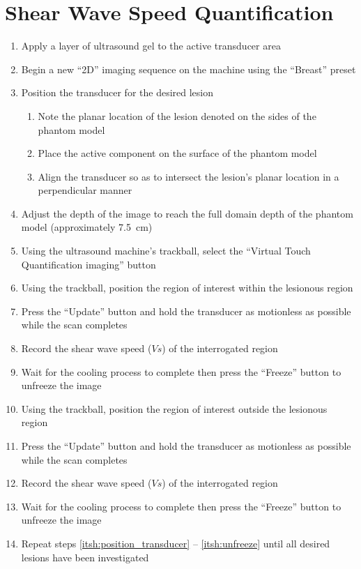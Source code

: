 	\section{Shear Wave Speed Quantification}
		\label{appsec:experimental_shear}
		\begin{enumerate}
			\item Apply a layer of ultrasound gel to the active transducer area
			\item Begin a new ``2D'' imaging sequence on the machine using the ``Breast'' preset
			\item \label{itsh:position_transducer} Position the transducer for the desired lesion
			\begin{enumerate}
				\item Note the planar location of the lesion denoted on the sides of the phantom model
				\item Place the active component on the surface of the phantom model
				\item Align the transducer so as to intersect the lesion's planar location in a perpendicular manner
			\end{enumerate}
			\item Adjust the depth of the image to reach the full domain depth of the phantom model (approximately \SI{7.5}{\cm})
			\item Using the ultrasound machine's trackball, select the ``Virtual Touch Quantification imaging'' button
			\item Using the trackball, position the region of interest within the lesionous region
			\item Press the ``Update'' button and hold the transducer as motionless as possible while the scan completes
			\item Record the shear wave speed ($Vs$) of the interrogated region
			\item Wait for the cooling process to complete then press the ``Freeze'' button to unfreeze the image
			\item Using the trackball, position the region of interest outside the lesionous region
			\item Press the ``Update'' button and hold the transducer as motionless as possible while the scan completes
			\item Record the shear wave speed ($Vs$) of the interrogated region
			\item \label{itsh:unfreeze} Wait for the cooling process to complete then press the ``Freeze'' button to unfreeze the image
			\item Repeat steps \ref{itsh:position_transducer} -- \ref{itsh:unfreeze} until all desired lesions have been investigated
		\end{enumerate}